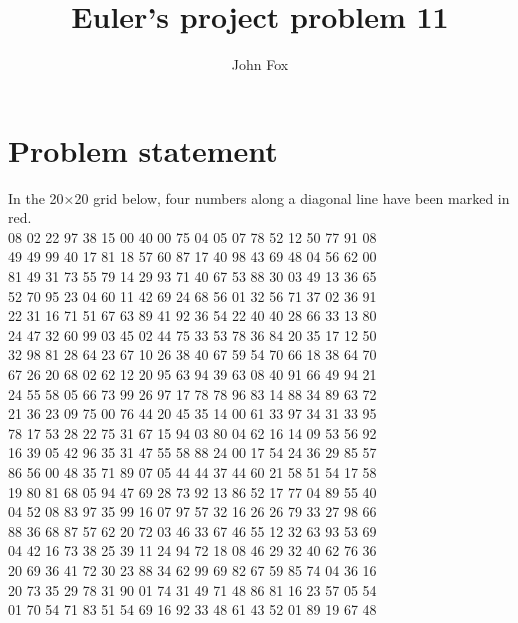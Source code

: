 \documentclass{article}
\title{Euler's project problem 11}
\author{John Fox}
\begin{document}
\maketitle

\section*{Problem statement} 
In the 20×20 grid below, four numbers along a diagonal line have been marked in red.\\

08 02 22 97 38 15 00 40 00 75 04 05 07 78 52 12 50 77 91 08\\
49 49 99 40 17 81 18 57 60 87 17 40 98 43 69 48 04 56 62 00\\
81 49 31 73 55 79 14 29 93 71 40 67 53 88 30 03 49 13 36 65\\
52 70 95 23 04 60 11 42 69 24 68 56 01 32 56 71 37 02 36 91\\
22 31 16 71 51 67 63 89 41 92 36 54 22 40 40 28 66 33 13 80\\
24 47 32 60 99 03 45 02 44 75 33 53 78 36 84 20 35 17 12 50\\
32 98 81 28 64 23 67 10 26 38 40 67 59 54 70 66 18 38 64 70\\
67 26 20 68 02 62 12 20 95 63 94 39 63 08 40 91 66 49 94 21\\
24 55 58 05 66 73 99 26 97 17 78 78 96 83 14 88 34 89 63 72\\
21 36 23 09 75 00 76 44 20 45 35 14 00 61 33 97 34 31 33 95\\
78 17 53 28 22 75 31 67 15 94 03 80 04 62 16 14 09 53 56 92\\
16 39 05 42 96 35 31 47 55 58 88 24 00 17 54 24 36 29 85 57\\
86 56 00 48 35 71 89 07 05 44 44 37 44 60 21 58 51 54 17 58\\
19 80 81 68 05 94 47 69 28 73 92 13 86 52 17 77 04 89 55 40\\
04 52 08 83 97 35 99 16 07 97 57 32 16 26 26 79 33 27 98 66\\
88 36 68 87 57 62 20 72 03 46 33 67 46 55 12 32 63 93 53 69\\
04 42 16 73 38 25 39 11 24 94 72 18 08 46 29 32 40 62 76 36\\
20 69 36 41 72 30 23 88 34 62 99 69 82 67 59 85 74 04 36 16\\
20 73 35 29 78 31 90 01 74 31 49 71 48 86 81 16 23 57 05 54\\
01 70 54 71 83 51 54 69 16 92 33 48 61 43 52 01 89 19 67 48\\
\end{document}
